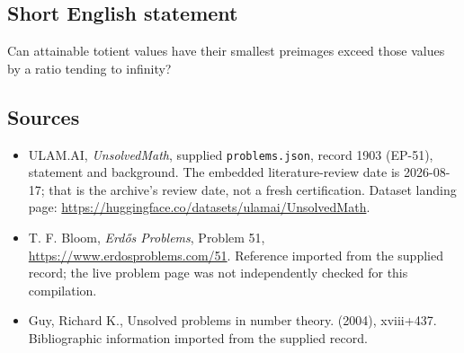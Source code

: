 \documentclass[11pt,a4paper]{article}
\begin{document}
\subsection{Short English statement}

Can attainable totient values have their smallest preimages exceed those values by a ratio tending to infinity?

\subsection{Sources}

{\small

\begin{itemize}

\item[\hypertarget{source:1903:1}{S1}] ULAM.AI, \emph{UnsolvedMath}, supplied \texttt{problems.json}, record 1903 (EP-51), statement and background. The embedded literature-review date is 2026-08-17; that is the archive’s review date, not a fresh certification. Dataset landing page: \url{https://huggingface.co/datasets/ulamai/UnsolvedMath}.

\item[\hypertarget{source:1903:2}{S2}] T. F. Bloom, \emph{Erdős Problems}, Problem 51, \url{https://www.erdosproblems.com/51}. Reference imported from the supplied record; the live problem page was not independently checked for this compilation.

\item[\hypertarget{source:1903:3}{S3}] Guy, Richard K., Unsolved problems in number theory. (2004), xviii+437. Bibliographic information imported from the supplied record.

\end{itemize}

}

\label{end:1903}
\end{document}

